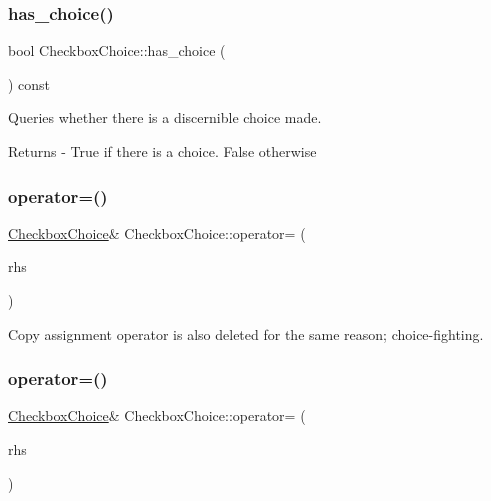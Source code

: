 \subsubsection{\texorpdfstring{has\+\_\+choice()}{has\_choice()}}
{\footnotesize\ttfamily bool Checkbox\+Choice\+::has\+\_\+choice (\begin{DoxyParamCaption}{ }\end{DoxyParamCaption}) const}

Queries whether there is a discernible choice made. \begin{DoxyReturn}{Returns}
-\/ True if there is a choice. False otherwise 
\end{DoxyReturn}
\mbox{\label{class_checkbox_choice_a8e99359a312be66fed6837c768e9e184}} 
\subsubsection{\texorpdfstring{operator=()}{operator=()}\hspace{0.1cm}{\footnotesize\ttfamily [1/2]}}
{\footnotesize\ttfamily \mbox{\hyperlink{class_checkbox_choice}{Checkbox\+Choice}}\& Checkbox\+Choice\+::operator= (\begin{DoxyParamCaption}\item[{const \mbox{\hyperlink{class_checkbox_choice}{Checkbox\+Choice}} \&}]{rhs }\end{DoxyParamCaption})\hspace{0.3cm}{\ttfamily [delete]}}

Copy assignment operator is also deleted for the same reason; choice-\/fighting. \mbox{\label{class_checkbox_choice_a8afcd170a63e030912620c18b0527fe8}} 
\subsubsection{\texorpdfstring{operator=()}{operator=()}\hspace{0.1cm}{\footnotesize\ttfamily [2/2]}}
{\footnotesize\ttfamily \mbox{\hyperlink{class_checkbox_choice}{Checkbox\+Choice}}\& Checkbox\+Choice\+::operator= (\begin{DoxyParamCaption}\item[{\mbox{\hyperlink{class_checkbox_choice}{Checkbox\+Choice}} \&\&}]{rhs }\end{DoxyParamCaption})\hspace{0.3cm}{\ttfamily [default]}}

